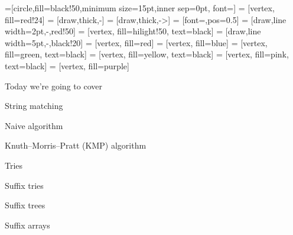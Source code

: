 =[circle,fill=black!50,minimum size=15pt,inner sep=0pt, font=\small]
 = [vertex, fill=red!24]
 = [draw,thick,-]
 = [draw,thick,->]
 = [font=\scriptsize,pos=0.5]
 = [draw,line width=2pt,-,red!50]
 = [vertex, fill=hilight!50, text=black]
 = [draw,line width=5pt,-,black!20]
 = [vertex, fill=red]
 = [vertex, fill=blue]
 = [vertex, fill=green, text=black]
 = [vertex, fill=yellow, text=black]
 = [vertex, fill=pink, text=black]
 = [vertex, fill=purple]



\maketitle

\begin{frame}{Today we're going to cover}
    \bi
        \item String matching
            \bi
                \item Naive algorithm
                \item Knuth--Morris--Pratt (KMP) algorithm
            \ei
        \item Tries
        \item Suffix tries
        \item Suffix trees
        \item Suffix arrays
    \ei
\end{frame}

